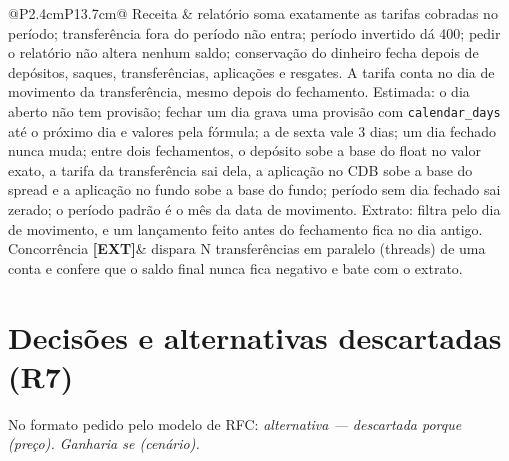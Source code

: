 \documentclass[11pt,a4paper]{article}
\newcommand{\ext}{\textbf{[EXT]}}          %
\newcommand{\tb}[1]{\texttt{#1}}           %
\begin{document}
\begin{longtable}{@{}P{2.4cm}P{13.7cm}@{}}
Receita & relatório soma exatamente as tarifas cobradas no período; transferência fora do período não entra; período invertido dá 400; pedir o relatório não altera nenhum saldo; conservação do dinheiro fecha depois de depósitos, saques, transferências, aplicações e resgates. A tarifa conta no dia de movimento da transferência, mesmo depois do fechamento. Estimada: o dia aberto não tem provisão; fechar um dia grava uma provisão com \tb{calendar_days} até o próximo dia e valores pela fórmula; a de sexta vale 3 dias; um dia fechado nunca muda; entre dois fechamentos, o depósito sobe a base do float no valor exato, a tarifa da transferência sai dela, a aplicação no CDB sobe a base do spread e a aplicação no fundo sobe a base do fundo; período sem dia fechado sai zerado; o período padrão é o mês da data de movimento. Extrato: filtra pelo dia de movimento, e um lançamento feito antes do fechamento fica no dia antigo. \\
Concorrência \ext & dispara N transferências em paralelo (threads) de uma conta e confere que o saldo final nunca fica negativo e bate com o extrato. \\
\bottomrule
\end{longtable}
\endgroup

\section{Decisões e alternativas descartadas (R7)}\label{sec:decisoes}

No formato pedido pelo modelo de RFC: \emph{alternativa --- descartada porque (preço). Ganharia se
(cenário).}
\end{document}
